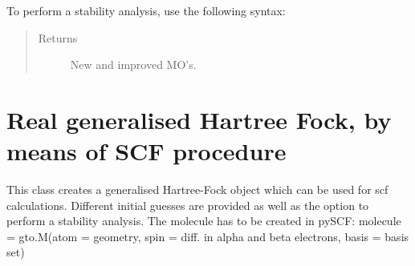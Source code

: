 \documentclass[letterpaper,10pt,english]{sphinxmanual}
\begin{document}
\begin{fulllineitems}
\begin{fulllineitems}
To perform a stability analysis, use the following syntax:

\begin{sphinxVerbatim}[commandchars=\\\{\}]
           
   
  
\end{sphinxVerbatim}
\begin{quote}\begin{description}
\item[{Returns}] \leavevmode
New and improved MO’s.

\end{description}\end{quote}

\end{fulllineitems}


\end{fulllineitems}

\label{\detokenize{real_GHF:module-ghf.real_GHF}}

\chapter{Real generalised Hartree Fock, by means of SCF procedure}
\label{\detokenize{real_GHF:real-generalised-hartree-fock-by-means-of-scf-procedure}}\label{\detokenize{real_GHF::doc}}
This class creates a generalised Hartree-Fock object which can be used for scf calculations. Different initial guesses
are provided as well as the option to perform a stability analysis.
The molecule has to be created in pySCF:
molecule = gto.M(atom = geometry, spin = diff. in alpha and beta electrons, basis = basis set)
\end{document}
